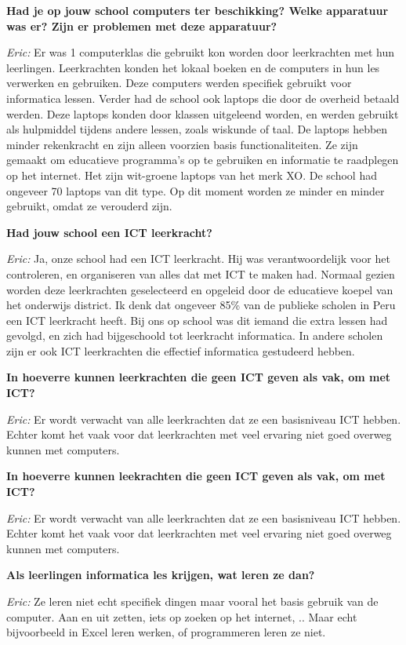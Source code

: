\textbf{Had je op jouw school computers ter beschikking? Welke apparatuur was er? Zijn er problemen met deze apparatuur?}

\textit{Eric:} Er was 1 computerklas die gebruikt kon worden door leerkrachten met hun leerlingen. Leerkrachten konden het lokaal boeken en de computers in hun les verwerken en gebruiken. Deze computers werden specifiek gebruikt voor informatica lessen. Verder had de school ook laptops die door de overheid betaald werden. Deze laptops konden door klassen uitgeleend worden, en werden gebruikt als hulpmiddel tijdens andere lessen, zoals wiskunde of taal. De laptops hebben minder rekenkracht en zijn alleen voorzien basis functionaliteiten. Ze zijn gemaakt om educatieve programma's op te gebruiken en informatie te raadplegen op het internet. Het zijn wit-groene laptops van het merk XO. De school had ongeveer 70 laptops van dit type. Op dit moment worden ze minder en minder gebruikt, omdat ze verouderd zijn.

\textbf{Had jouw school een ICT leerkracht?}

\textit{Eric:} Ja, onze school had een ICT leerkracht. Hij was verantwoordelijk voor het controleren, en organiseren van alles dat met ICT te maken had. Normaal gezien worden deze leerkrachten geselecteerd en opgeleid door de educatieve koepel van het onderwijs district. Ik denk dat ongeveer 85\% van de publieke scholen in Peru een ICT leerkracht heeft. Bij ons op school was dit iemand die extra lessen had gevolgd, en zich had bijgeschoold tot leerkracht informatica. In andere scholen zijn er ook ICT leerkrachten die effectief informatica gestudeerd hebben.

\textbf{In hoeverre kunnen leerkrachten die geen ICT geven als vak, om met ICT?}

\textit{Eric:} Er wordt verwacht van alle leerkrachten dat ze een basisniveau ICT hebben. Echter komt het vaak voor dat leerkrachten met veel ervaring niet goed overweg kunnen met computers. 

\textbf{In hoeverre kunnen leekrachten die geen ICT geven als vak, om met ICT?}

\textit{Eric:} Er wordt verwacht van alle leerkrachten dat ze een basisniveau ICT hebben. Echter komt het vaak voor dat leerkrachten met veel ervaring niet goed overweg kunnen met computers. 

\textbf{Als leerlingen informatica les krijgen, wat leren ze dan?}

\textit{Eric:} Ze leren niet echt specifiek dingen maar vooral het basis gebruik van de computer. Aan en uit zetten, iets op zoeken op het internet, .. Maar echt bijvoorbeeld in Excel leren werken, of programmeren leren ze niet.

